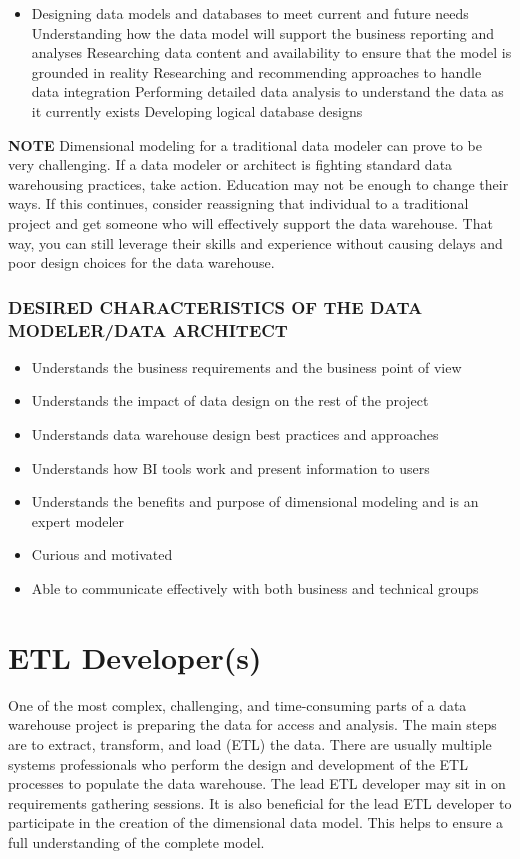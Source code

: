 \documentclass{vldb}
\newcommand{\bi}{\begin{itemize}}
\newcommand{\ei}{\end{itemize}}
\newcommand{\ii}{\item}
\begin{document}
\bi
\ii Designing data models and databases to meet current and future needs
Understanding how the data model will support the business reporting and analyses
Researching data content and availability to ensure that the model is grounded in reality
Researching and recommending approaches to handle data integration
Performing detailed data analysis to understand the data as it currently exists
Developing logical database designs
\ei

\noindent
\textbf{NOTE} Dimensional modeling for a traditional data modeler can prove to be very challenging. If a data modeler or architect is fighting standard data warehousing practices, take action. Education may not be enough to change their ways. If this continues, consider reassigning that individual to a traditional project and get someone who will effectively support the data warehouse. That way, you can still leverage their skills and experience without causing delays and poor design choices for the data warehouse.

\subsubsection*{DESIRED CHARACTERISTICS OF THE DATA MODELER/DATA ARCHITECT}
\bi
\ii Understands the business requirements and the business point of view
\ii Understands the impact of data design on the rest of the project
\ii Understands data warehouse design best practices and approaches
\ii Understands how BI tools work and present information to users
\ii Understands the benefits and purpose of dimensional modeling and is an expert modeler
\ii Curious and motivated
\ii Able to communicate effectively with both business and technical groups
\ei

\section{ETL Developer(s)}
One of the most complex, challenging, and time-consuming parts of a data warehouse project is preparing the data for access and analysis. The main steps are to extract, transform, and load (ETL) the data. There are usually multiple systems professionals who perform the design and development of the ETL processes to populate the data warehouse. The lead ETL developer may sit in on requirements gathering sessions. It is also beneficial for the lead ETL developer to participate in the creation of the dimensional data model. This helps to ensure a full understanding of the complete model.
\end{document}
